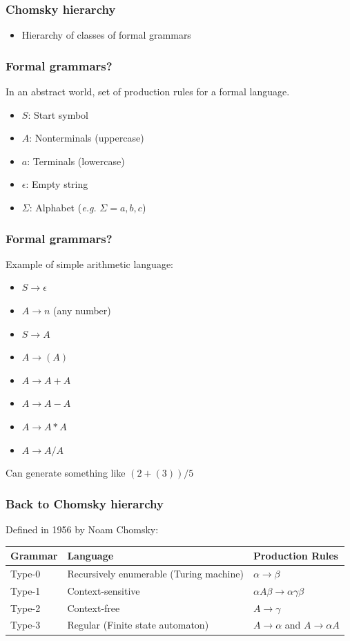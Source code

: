 \documentclass[aspectratio=169,xcolor=table]{beamer}
\begin{document}
\begin{frame}
  \frametitle{Chomsky hierarchy}
  \begin{itemize}
  \item Hierarchy of classes of formal grammars
  \end{itemize}
\end{frame}


\begin{frame}
  \frametitle{Formal grammars?}
  In an abstract world, set of production rules for a formal language.
  \begin{itemize}
  \item $S$: Start symbol
  \item $A$: Nonterminals (uppercase)
  \item $a$: Terminals (lowercase)
  \item $\epsilon$: Empty string
  \item $\Sigma$: Alphabet (\textit{e.g.} $\Sigma = {a, b, c}$)
  \end{itemize}
\end{frame}


\begin{frame}
  \frametitle{Formal grammars?}
  Example of simple arithmetic language:
  \begin{itemize}
  \item $S \to \epsilon$
  \item $A \to n$ (any number)
  \item $S \to A$
  \item $A \to ( A )$
  \item $A \to A + A$
  \item $A \to A - A$
  \item $A \to A * A$
  \item $A \to A / A$
  \end{itemize}
  Can generate something like $(2 + (3)) / 5$
\end{frame}


\begin{frame}
  \frametitle{Back to Chomsky hierarchy}
  Defined in 1956 by Noam Chomsky:
  \begin{center}
    \begin{tabular}{l!{\vrule}l!{\vrule}l}
      Grammar & Language & Production Rules \\ \hline
      Type-0  & Recursively enumerable (Turing machine) & $\alpha \to \beta$ \\
      Type-1  & Context-sensitive & $\alpha A \beta \to \alpha \gamma \beta$ \\
      Type-2  & Context-free & $A \to \gamma$ \\
      Type-3  & Regular (Finite state automaton) & $A \to \alpha$ and $A \to \alpha A$ \\
    \end{tabular}
  \end{center}
\end{frame}
\end{document}
